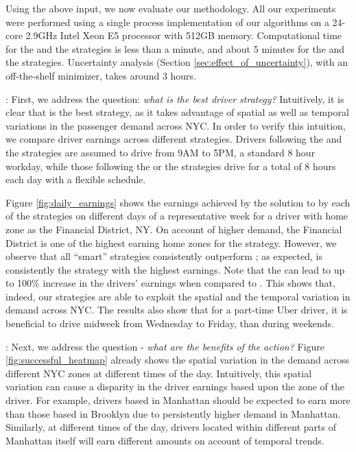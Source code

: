 Using the above input, we now evaluate our methodology. All our experiments were performed using a single process implementation of our algorithms on a 24-core 2.9GHz Intel Xeon E5 processor with 512GB memory. Computational time for the {\naive} and the {\relocation} strategies is less than a minute, and about 5 minutes for the {\flexible} and the {\relocationflexible} strategies. Uncertainty analysis (Section \ref{sec:effect_of_uncertainty}), with an off-the-shelf minimizer, takes around 3 hours.

: First, we address the question: \textit{what is the best driver strategy?} Intuitively, it is clear that {\relocationflexible} is the best strategy, as it takes advantage of spatial as well as temporal variations in the passenger demand across NYC. In order to verify this intuition, we compare driver earnings across different strategies. Drivers following the {\naive} and the {\relocation} strategies are assumed to drive from 9AM to 5PM, a standard 8 hour workday, while those following the {\flexible} or the {\relocationflexible} strategies drive for a total of 8 hours each day with a flexible schedule.

Figure \ref{fig:daily_earnings} shows the earnings achieved by 
the solution to {\originalproblem} by each of the strategies on different days of a representative week for a driver with home zone as the Financial District, NY. On account of higher demand, the Financial District is one of the highest earning home zones for the {\naive} strategy. However, we observe that all ``smart'' strategies consistently outperform {\naive};
as expected, {\relocationflexible} is consistently the strategy with the highest earnings.
Note that the {\relocationflexible} can lead to up to 100\% increase in the drivers'
earnings when compared to {\naive}.  
This shows that, indeed, our strategies are able to exploit the spatial and the temporal variation in demand across NYC. The results also show
that for a part-time Uber driver, it is beneficial to drive midweek from Wednesday to Friday, than during weekends.





: 
Next, we address the question - \textit{what are the benefits of the {\relocate} action?} Figure \ref{fig:successful_heatmap} already shows the spatial variation in the demand across different NYC zones at different times of the day. Intuitively, this spatial variation can cause a disparity in the driver earnings based upon the zone of the driver. For example, drivers based in Manhattan should be expected 
to earn more than those based in Brooklyn due to persistently higher demand in Manhattan. Similarly, at different times of the day, drivers located within different parts of Manhattan itself will earn different amounts on account of temporal trends.


